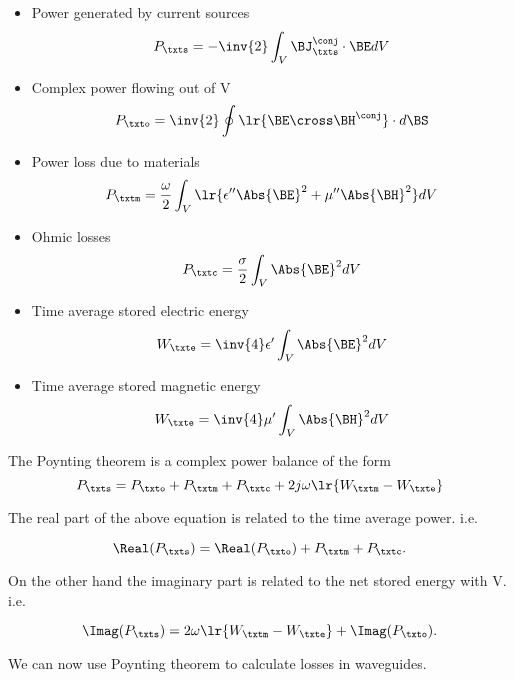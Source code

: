 \begin{itemize}
\item Power generated by current sources
\begin{equation}\label{eqn:uwavesLecture2:1320}
P_\txts = -\inv{2} \int_V \BJ_\txts^\conj \cdot \BE dV
\end{equation}
\item Complex power flowing out of V
\begin{equation}\label{eqn:uwavesLecture2:1340}
P_\txto = \inv{2} \oint \lr{ \BE \cross \BH^\conj } \cdot d\BS
\end{equation}
\item Power loss due to materials
\begin{equation}\label{eqn:uwavesLecture2:1360}
P_\txtm = \frac{\omega}{2} \int_V \lr{ \epsilon'' \Abs{\BE}^2 + \mu'' \Abs{\BH}^2 } dV
\end{equation}
\item Ohmic losses
\begin{equation}\label{eqn:uwavesLecture2:1380}
P_\txtc = \frac{\sigma}{2} \int_V \Abs{\BE}^2 dV
\end{equation}
\item Time average stored electric energy
\begin{equation}\label{eqn:uwavesLecture2:1400}
W_\txte = \inv{4} \epsilon' \int_V \Abs{\BE}^2 dV
\end{equation}
\item Time average stored magnetic energy
\begin{equation}\label{eqn:uwavesLecture2:1420}
W_\txte = \inv{4} \mu' \int_V \Abs{\BH}^2 dV
\end{equation}
\end{itemize}

The Poynting theorem is a complex power balance of the form
\begin{equation}\label{eqn:uwavesLecture2:1440}
P_\txts = P_\txto + P_\txtm + P_\txtc + 2 j \omega \lr{ W_\txtm - W_\txte }
\end{equation}

The real part of the above equation is related to the time average power.  i.e.

\begin{equation}\label{eqn:uwavesLecture2:1460}
\Real(P_\txts) = \Real(P_\txto) + P_\txtm + P_\txtc.
\end{equation}

On the other hand the imaginary part is related to the net stored energy with V.  i.e.

\begin{equation}\label{eqn:uwavesLecture2:1480}
\Imag( P_\txts ) = 2 \omega \lr{ W_\txtm - W_\txte } + \Imag( P_\txto ).
\end{equation}

We can now use Poynting theorem to calculate losses in waveguides.
